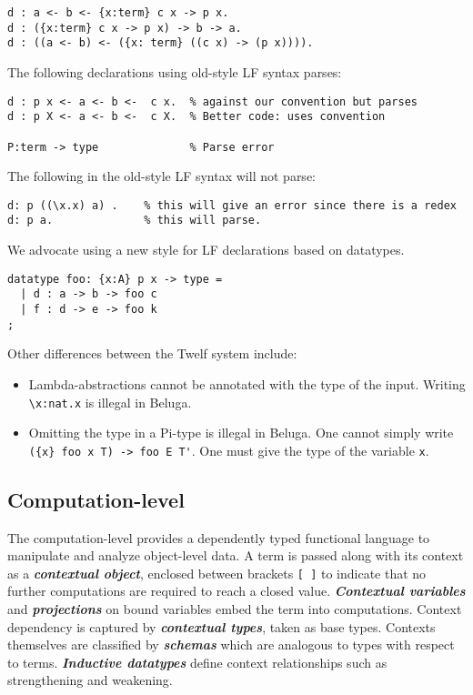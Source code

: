 \documentclass[11pt]{article}
\begin{document}
\begin{verbatim}
d : a <- b <- {x:term} c x -> p x.
d : ({x:term} c x -> p x) -> b -> a.
d : ((a <- b) <- ({x: term} ((c x) -> (p x)))).
\end{verbatim}


The following declarations using old-style LF syntax parses:
\begin{verbatim}
d : p x <- a <- b <-  c x.  % against our convention but parses
d : p X <- a <- b <-  c X.  % Better code: uses convention

P:term -> type              % Parse error
\end{verbatim}


The following in the old-style LF syntax will not parse:
\begin{verbatim}
d: p ((\x.x) a) .    % this will give an error since there is a redex
d: p a.              % this will parse.
\end{verbatim}


We advocate using a new style for LF declarations based on datatypes.

\begin{verbatim}
datatype foo: {x:A} p x -> type =
  | d : a -> b -> foo c
  | f : d -> e -> foo k
;
\end{verbatim}

Other differences between the Twelf system include:
\begin{itemize}
\item Lambda-abstractions cannot be annotated with the type of the input. Writing \verb+\x:nat.x+ is illegal in Beluga.
\item Omitting the type in a Pi-type is illegal in Beluga. One cannot simply write \verb+({x} foo x T) -> foo E T'+. One must give the type of the variable \verb+x+.
\end{itemize}



\subsection{Computation-level}
The computation-level provides a dependently typed functional language to manipulate and analyze object-level data.
A term is passed along with its context as a \textbf{\textit{contextual object}}, enclosed between brackets \verb+[ ]+ to indicate that no further computations are required to reach a closed value.
\textbf{\textit{Contextual variables}} and \textbf{\textit{projections}} on bound variables embed the term into computations.
Context dependency is captured by \textit{\textbf{contextual types}}, taken as base types.
Contexts themselves are classified by \textit{\textbf{schemas}} which are analogous to types with respect to terms.
\textit{\textbf{Inductive datatypes}} define context relationships such as strengthening and weakening.
\end{document}
